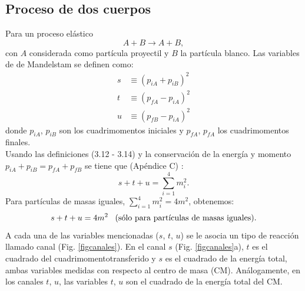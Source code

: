 \subsection*{Proceso de dos cuerpos}
Para un proceso el\'astico 
\begin{equation}\label{ecu2_12}
A+B\rightarrow A+B,
\end{equation}
con $A$ considerada como part\'icula proyectil y $B$ la part\'icula blanco. Las variables de de  Mandelstam se definen como: 
\begin{align}\label{ecuacion2_13}
s &\equiv (p_{iA}+p_{iB})^2\\
t &\equiv (p_{fA}-p_{iA})^2\\
u &\equiv (p_{fB}-p_{iA})^2
\end{align}
donde $p_{iA}$, $p_{iB}$ son los cuadrimomentos iniciales y 
$p_{fA}$, $p_{fA}$ los cuadrimomentos finales. \\

\sp Usando las definiciones (3.12 - 3.14) y la conservaci\'on de la energ\'ia y momento $p_{iA}+p_{iB}=p_{fA}+p_{fB}$ se tiene que (Ap\'endice C) \cite{varone}:
\begin{equation}\label{ecu2_16}
s+t+u=\sum^4_{i=1}m^2_{i}.
\end{equation}
Para part\'iculas de masas iguales, $\sum^4_{i=1}m^2_i=4m^2$, obtenemos:
\begin{equation}\label{ecu2_16}
s+t+u=4m^2\, \ \ \textup{(s\'olo para part\'iculas de masas iguales)}.
\end{equation}
A cada una de las variables mencionadas ($s$, $t$, $u$) se le asocia un tipo de reacci\'on llamado canal (Fig. \ref{figcanales}).  En el canal $s$ (Fig. \ref{figcanales}a), $t$ es el cuadrado del cuadrimomento\newpage transferido y $s$ es el cuadrado de la energ\'ia total, ambas variables medidas con  respecto al centro de masa (CM). An\'alogamente, en los canales $t$, $u$, las variables $t$, $u$ son el cuadrado de la energ\'ia total del CM.\\

